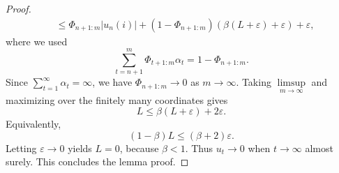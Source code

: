 \documentclass[10pt,a4paper]{amsart}
\renewcommand{\epsilon}{\varepsilon}
\begin{document}
\begin{proof}
\begin{align*}
    &\le
    \Phi_{n+1:m}|u_n(i)|
    +
    \left(1-\Phi_{n+1:m}\right)
    \left(\beta(L+\epsilon)+\epsilon\right)
    +
    \epsilon,
\end{align*}
where we used
\[
    \sum_{t=n+1}^{m}\Phi_{t+1:m}\alpha_t
    =
    1-\Phi_{n+1:m}.
\]
Since \(\sum\limits_{t = 1}^{\infty}\alpha_t=\infty\), we have \(\Phi_{n+1:m}\to0\) as \(m\to\infty\). Taking \(\limsup\limits_{m\to\infty}\) and maximizing over the finitely many coordinates gives
\[
    L\le \beta(L+\epsilon)+2\epsilon.
\]
Equivalently,
\[
    (1-\beta)L\le(\beta+2)\epsilon.
\]
Letting \(\epsilon\rightarrow0\) yields \(L=0\), because \(\beta<1\). Thus \(u_t\to0\) when \(t\rightarrow\infty\) almost surely. This concludes the lemma proof.
\end{proof}
\end{document}
